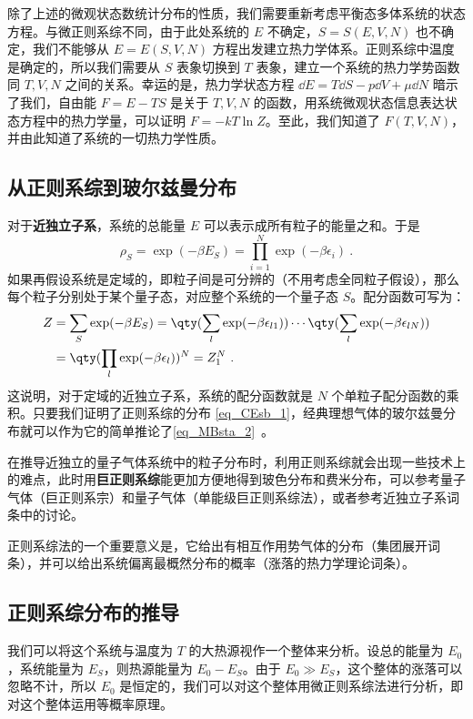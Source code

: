 除了上述的微观状态数统计分布的性质，我们需要重新考虑平衡态多体系统的状态方程。与微正则系综不同，由于此处系统的 $E$ 不确定，$S=S(E,V,N)$ 也不确定，我们不能够从 $E=E(S,V,N)$ 方程出发建立热力学体系。正则系综中温度是确定的，所以我们需要从 $S$ 表象切换到 $T$ 表象，建立一个系统的热力学势函数同 $T,V,N$ 之间的关系。幸运的是，热力学状态方程 $\dd E=T\dd S-p\dd V+\mu\dd N$ 暗示了我们，自由能 $F=E-TS$ 是关于 $T,V,N$ 的函数，用系统微观状态信息表达状态方程中的热力学量，可以证明 $F=-kT\ln Z$。至此，我们知道了 $F(T,V,N)$，并由此知道了系统的一切热力学性质。

\subsection{从正则系综到玻尔兹曼分布}
对于\textbf{近独立子系}，系统的总能量 $E$ 可以表示成所有粒子的能量之和。于是
\begin{equation}
\rho_S=\exp(-\beta E_S)=\prod_{i=1}^N\exp(-\beta\epsilon_i)~.
\end{equation}
如果再假设系统是定域的，即粒子间是可分辨的（不用考虑全同粒子假设），那么每个粒子分别处于某个量子态，对应整个系统的一个量子态 $S$。配分函数可写为：
\begin{equation}
\begin{aligned}
Z&=\sum_S\exp(-\beta E_S)=\qty(\sum_{l}\exp(-\beta\epsilon_{l1}))\cdots\qty(\sum_{l}\exp(-\beta\epsilon_{lN}))\\
&=\qty(\prod_{l}\exp(-\beta\epsilon_{l}))^N=Z_1^N~.
\end{aligned}
\end{equation}
这说明，对于定域的近独立子系，系统的配分函数就是 $N$ 个单粒子配分函数的乘积。只要我们证明了正则系综的分布 \autoref{eq_CEsb_1}，经典理想气体的玻尔兹曼分布就可以作为它的简单推论了\autoref{eq_MBsta_2}~。

在推导近独立的量子气体系统中的粒子分布时，利用正则系综就会出现一些技术上的难点，此时用\textbf{巨正则系综}能更加方便地得到玻色分布和费米分布，可以参考量子气体（巨正则系宗）和量子气体（单能级巨正则系综法），或者参考近独立子系词条中的讨论。

正则系综法的一个重要意义是，它给出有相互作用势气体的分布（集团展开词条），并可以给出系统偏离最概然分布的概率（涨落的热力学理论词条）。
\subsection{正则系综分布的推导}
我们可以将这个系统与温度为 $T$ 的大热源视作一个整体来分析。设总的能量为 $E_0$，系统能量为 $E_S$，则热源能量为 $E_0-E_S$。由于 $E_0\gg E_S$，这个整体的涨落可以忽略不计，所以 $E_0$ 是恒定的，我们可以对这个整体用微正则系综法进行分析，即对这个整体运用等概率原理。

